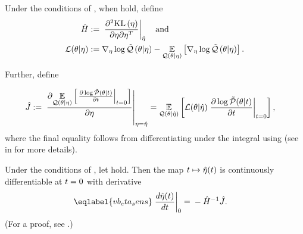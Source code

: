 \begin{defn}
%
Under the conditions of , when  hold, define
%
\begin{align*}
%
\hessopt :={}& \fracat{\partial^2 \KL{\eta}}
                      {\partial \eta \partial \eta^T}
                      {\etaopt} \mathand \\
%
\lqgradbar{\theta \vert \eta} :={}&
    \lqgrad{\theta \vert \eta} -
    \expect{\q(\theta \vert \eta)}{\lqgrad{\theta \vert \eta}}.
%
\end{align*}


Further, define

\begin{align*}
%
\crosshessian :={}&
    \fracat{\partial
            \expect{\q(\theta \vert \eta)}
                   {\fracat{\partial \log \ptil(\theta \vert \t)}
                           {\partial \t}{\t=0} }
            }
        {\partial \eta}{\eta = \etaopt}
={}
    \expect{\q(\theta \vert \etaopt)}{
          \lqgradbar{\theta \vert \etaopt}
          \fracat{\partial \log \ptil(\theta \vert \t)}
                 {\partial \t}{\t=0}},
%
\end{align*}
%
where the final equality follows from differentiating under the integral using
 (see  in  for
more details).
%
\end{defn}


\begin{thm}
%
Under the conditions of , let
 hold.   Then the map $t \mapsto
\hat\eta(t)$ is continuously differentiable at $t=0$ with derivative
%
\begin{align}\eqlabel{vb_eta_sens}
%
\fracat{d \etaopt(\t)}{d \t}{0} ={}&
    - \hessopt^{-1} \crosshessian.
%
\end{align}
%
(For a proof, see  .)
%
\end{thm}

